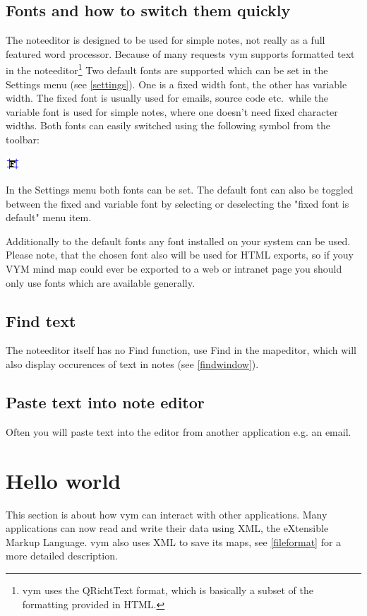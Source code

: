 \documentclass[12pt,a4paper]{article}
\newcommand{\vym}{{\sc vym }}
\begin{document}
\subsection{Fonts and how to switch them quickly}
The noteeditor is designed to be used for simple notes, not really as a
full featured word processor. Because of many requests \vym supports
formatted text in the noteeditor\footnote{
    \vym uses the QRichtText format, which is basically a subset of the
    formatting provided in HTML.}
Two default fonts are supported which can be set in the Settings menu
(see \ref{settings}).
One is a fixed width font, the other has variable width. The fixed font
is usually used for emails, source code etc.\ while the variable font is
used for simple notes, where one doesn't need fixed character widths.
Both fonts can easily switched using the following symbol from the
toolbar:
\begin{center}
    \includegraphics[width=0.5cm]{images/formatfixedfont.png}
\end{center}
In the Settings menu both fonts can be set. The default font can also be
toggled between the fixed and variable font by selecting or deselecting
the "fixed font is default" menu item.

Additionally to the default fonts any font installed on your system can
be used. Please note, that the chosen font also will be used for HTML
exports, so if youy VYM mind map could ever be exported to a web or
intranet page you should only use fonts which are available generally.

\subsection{Find text}
The noteeditor itself has no Find function, use Find in the mapeditor,
which will also display occurences of text in notes (see
\ref{findwindow}).

\subsection{Paste text into note editor}
Often you will paste text into the editor from another application e.g.
an email.

\section{Hello world}
This section is about how \vym can interact with other applications.
Many applications can now read and write their data using XML, the
eXtensible Markup Language. \vym also uses XML to save its maps, see
\ref{fileformat} for a more detailed description. 
\end{document}
